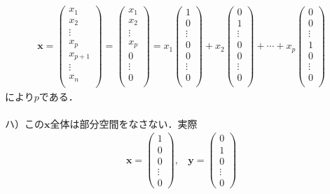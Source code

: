\documentclass[dvipdfmx,uplatex,11pt]{jsarticle}
\begin{document}
\begin{eqnarray*}
\bm{x}=
\begin{pmatrix}
x_1 \\
x_2 \\
\vdots \\
x_{p} \\
x_{p+1} \\
\vdots \\
x_n \\
\end{pmatrix}
=
\begin{pmatrix}
x_1 \\
x_2 \\
\vdots \\
x_{p} \\
0 \\
\vdots \\
0 \\
\end{pmatrix}
=x_1
\begin{pmatrix}
1 \\
0 \\
\vdots \\
0 \\
0 \\
\vdots \\
0 \\
\end{pmatrix}
+x_2
\begin{pmatrix}
0 \\
1 \\
\vdots \\
0 \\
0 \\
\vdots \\
0 \\
\end{pmatrix}
+\cdots +x_p
\begin{pmatrix}
0 \\
0 \\
\vdots \\
1 \\
0 \\
\vdots \\
0 \\
\end{pmatrix}
\end{eqnarray*}
により$p$である．\\
\dotfill \\
ハ）この$\bm{x}全体$は部分空間をなさない．実際
\begin{eqnarray*}
\bm{x}=
\begin{pmatrix}
1 \\
0 \\
0 \\
\vdots \\
0
\end{pmatrix}
,~~~~
\bm{y}=
\begin{pmatrix}
0 \\
1 \\
0 \\
\vdots \\
0
\end{pmatrix}
\end{eqnarray*}
\end{document}
